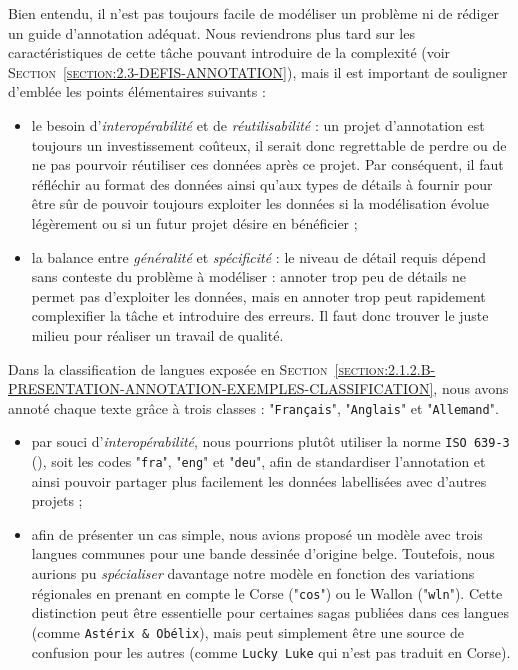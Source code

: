 			Bien entendu, il n'est pas toujours facile de modéliser un problème ni de rédiger un guide d'annotation adéquat.
			Nous reviendrons plus tard sur les caractéristiques de cette tâche pouvant introduire de la complexité (voir \textsc{Section~\ref{section:2.3-DEFIS-ANNOTATION}}), mais il est important de souligner d'emblée les points élémentaires suivants :
			\begin{itemize}
				\item le besoin d'\textit{interopérabilité} et de \textit{réutilisabilité} : un projet d'annotation est toujours un investissement coûteux, il serait donc regrettable de perdre ou de ne pas pourvoir réutiliser ces données après ce projet.
				Par conséquent, il faut réfléchir au format des données ainsi qu'aux types de détails à fournir pour être sûr de pouvoir toujours exploiter les données si la modélisation évolue légèrement ou si un futur projet désire en bénéficier ;
				\item la balance entre \textit{généralité} et \textit{spécificité} : le niveau de détail requis dépend sans conteste du problème à modéliser : annoter trop peu de détails ne permet pas d'exploiter les données, mais en annoter trop peut rapidement complexifier la tâche et introduire des erreurs.
				Il faut donc trouver le juste milieu pour réaliser un travail de qualité.
			\end{itemize}
			\begin{leftBarExamples}
				Dans la classification de langues exposée en \textsc{Section~\ref{section:2.1.2.B-PRESENTATION-ANNOTATION-EXEMPLES-CLASSIFICATION}}, nous avons annoté chaque texte grâce à trois classes : "\texttt{Français}", "\texttt{Anglais}" et "\texttt{Allemand}".
				\begin{itemize}
					\item par souci d'\textit{interopérabilité}, nous pourrions plutôt utiliser la norme \texttt{ISO 639-3} (\cite{international-organization-for-standardization:2007:codes-representation-names}), soit les codes "\texttt{fra}", "\texttt{eng}" et "\texttt{deu}", afin de standardiser l'annotation et ainsi pouvoir partager plus facilement les données labellisées avec d'autres projets ;
					\item afin de présenter un cas simple, nous avions proposé un modèle avec trois langues communes pour une bande dessinée d'origine belge.
					Toutefois, nous aurions pu \textit{spécialiser} davantage notre modèle en fonction des variations régionales en prenant en compte le Corse ("\texttt{cos}") ou le Wallon ("\texttt{wln}").
					Cette distinction peut être essentielle pour certaines sagas publiées dans ces langues (comme \texttt{Astérix \& Obélix}), mais peut simplement être une source de confusion pour les autres (comme \texttt{Lucky Luke} qui n'est pas traduit en Corse).
				\end{itemize}
			\end{leftBarExamples}
			
